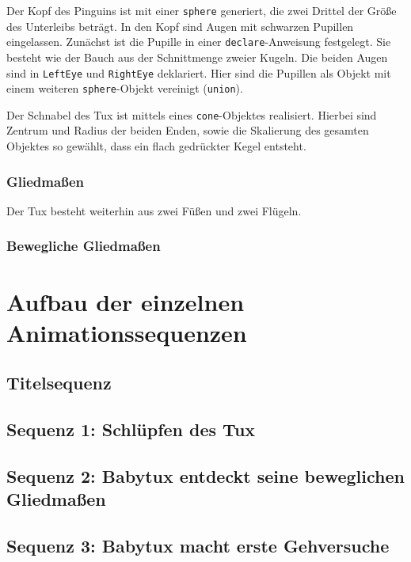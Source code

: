 \documentclass[11pt,parskip]{scrartcl}
\begin{document}
Der Kopf des Pinguins ist mit einer \texttt{sphere} generiert, die zwei Drittel
der Größe des Unterleibs beträgt. In den Kopf sind Augen mit schwarzen Pupillen
eingelassen. Zunächst ist die Pupille in einer \texttt{declare}-Anweisung
festgelegt. Sie besteht wie der Bauch aus der Schnittmenge zweier Kugeln. Die
beiden Augen sind in \texttt{LeftEye} und \texttt{RightEye} deklariert. Hier
sind die Pupillen als Objekt mit einem weiteren \texttt{sphere}-Objekt
vereinigt (\texttt{union}).

Der Schnabel des Tux ist mittels eines \texttt{cone}-Objektes realisiert.
Hierbei sind Zentrum und Radius der beiden Enden, sowie die Skalierung des
gesamten Objektes so gewählt, dass ein flach gedrückter Kegel entsteht.

\subsubsection{Gliedmaßen}
Der Tux besteht weiterhin aus zwei Füßen und zwei Flügeln.


\subsubsection{Bewegliche Gliedmaßen}


\newpage

\section{Aufbau der einzelnen Animationssequenzen}


\subsection{Titelsequenz}


\subsection{Sequenz 1: Schlüpfen des Tux}


\subsection{Sequenz 2: Babytux entdeckt seine beweglichen Gliedmaßen}


\subsection{Sequenz 3: Babytux macht erste Gehversuche}
\end{document}

